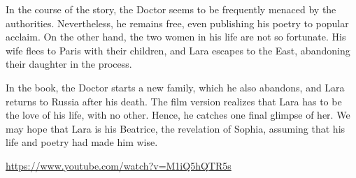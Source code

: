 In the course of the story, the Doctor seems to be frequently menaced by the authorities. Nevertheless, he remains free, even publishing his poetry to popular acclaim. On the other hand, the two women in his life are not so fortunate. His wife flees to Paris with their children, and Lara escapes to the East, abandoning their daughter in the process.

In the book, the Doctor starts a new family, which he also abandons, and Lara returns to Russia after his death. The film version realizes that Lara has to be the love of his life, with no other. Hence, he catches one final glimpse of her. We may hope that Lara is his Beatrice, the revelation of Sophia, assuming that his life and poetry had made him wise.

\url{https://www.youtube.com/watch?v=M1iQ5hQTR5s}



